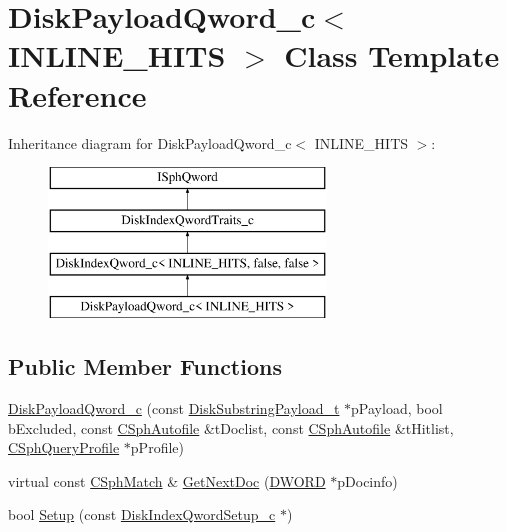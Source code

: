 \hypertarget{classDiskPayloadQword__c}{\section{Disk\-Payload\-Qword\-\_\-c$<$ I\-N\-L\-I\-N\-E\-\_\-\-H\-I\-T\-S $>$ Class Template Reference}
\label{classDiskPayloadQword__c}
}
Inheritance diagram for Disk\-Payload\-Qword\-\_\-c$<$ I\-N\-L\-I\-N\-E\-\_\-\-H\-I\-T\-S $>$\-:\begin{figure}[H]
\begin{center}
\leavevmode
\includegraphics[height=4.000000cm]{classDiskPayloadQword__c}
\end{center}
\end{figure}
\subsection*{Public Member Functions}
\begin{DoxyCompactItemize}
\item 
\hyperlink{classDiskPayloadQword__c_a68ae5e9295f919c713b2947480517860}{Disk\-Payload\-Qword\-\_\-c} (const \hyperlink{structDiskSubstringPayload__t}{Disk\-Substring\-Payload\-\_\-t} $\ast$p\-Payload, bool b\-Excluded, const \hyperlink{classCSphAutofile}{C\-Sph\-Autofile} \&t\-Doclist, const \hyperlink{classCSphAutofile}{C\-Sph\-Autofile} \&t\-Hitlist, \hyperlink{classCSphQueryProfile}{C\-Sph\-Query\-Profile} $\ast$p\-Profile)
\item 
virtual const \hyperlink{classCSphMatch}{C\-Sph\-Match} \& \hyperlink{classDiskPayloadQword__c_a57e25f4a8bb33ee595135f5af7f81673}{Get\-Next\-Doc} (\hyperlink{sphinxstd_8h_a798af1e30bc65f319c1a246cecf59e39}{D\-W\-O\-R\-D} $\ast$p\-Docinfo)
\item 
bool \hyperlink{classDiskPayloadQword__c_a61ee01db0e4d029de949378f26f9b3f5}{Setup} (const \hyperlink{classDiskIndexQwordSetup__c}{Disk\-Index\-Qword\-Setup\-\_\-c} $\ast$)
\end{DoxyCompactItemize}

